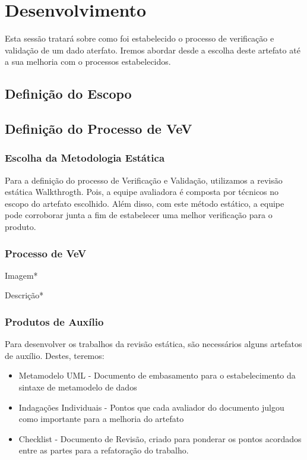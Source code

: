 \chapter[Desenvolvimento ]{Desenvolvimento}
Esta sessão tratará sobre como foi estabelecido o processo de verificação e
validação de um dado aterfato. Iremos abordar desde a escolha deste artefato até
a sua melhoria com o processos estabelecidos.
\section{Definição do Escopo}

\section{Definição do Processo de VeV}
\subsection{Escolha da Metodologia Estática}
Para a definição do processo de Verificação e Validação, utilizamos a revisão
estática Walkthrogth. Pois,  a equipe avaliadora é composta por técnicos no escopo
do artefato escolhido. Além disso, com este método estático, a equipe pode corroborar
junta a fim de estabelecer uma melhor verificação para o produto.

\subsection{Processo de VeV}
Imagem*

Descrição*

\subsection{Produtos de Auxílio}
Para desenvolver os trabalhos da revisão estática, são necessários alguns artefatos
de auxílio. Destes, teremos:

\begin{itemize}
\item Metamodelo UML - Documento de embasamento para o estabelecimento da sintaxe
de metamodelo de dados
\item Indagações Individuais - Pontos que cada avaliador do documento julgou como
importante para a melhoria do artefato
\item Checklist - Documento de Revisão, criado para ponderar os pontos acordados
entre as partes para a refatoração do trabalho.
\end{itemize}

